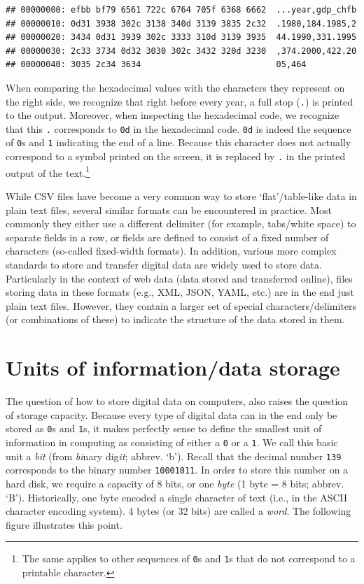 \documentclass[
  12pt,
]{style/krantz}
\begin{document}
\begin{verbatim}
## 00000000: efbb bf79 6561 722c 6764 705f 6368 6662  ...year,gdp_chfb
## 00000010: 0d31 3938 302c 3138 340d 3139 3835 2c32  .1980,184.1985,2
## 00000020: 3434 0d31 3939 302c 3333 310d 3139 3935  44.1990,331.1995
## 00000030: 2c33 3734 0d32 3030 302c 3432 320d 3230  ,374.2000,422.20
## 00000040: 3035 2c34 3634                           05,464
\end{verbatim}

When comparing the hexadecimal values with the characters they represent on the right side, we recognize that right before every year, a full stop (\texttt{.}) is printed to the output. Moreover, when inspecting the hexadecimal code, we recognize that this \texttt{.} corresponds to \texttt{0d} in the hexadecimal code. \texttt{0d} is indeed the sequence of \texttt{0}s and \texttt{1} indicating the end of a line. Because this character does not actually correspond to a symbol printed on the screen, it is replaced by \texttt{.} in the printed output of the text.\footnote{The same applies to other sequences of \texttt{0}s and \texttt{1}s that do not correspond to a printable character.}

While CSV files have become a very common way to store `flat'/table-like data in plain text files, several similar formats can be encountered in practice. Most commonly they either use a different delimiter (for example, tabs/white space) to separate fields in a row, or fields are defined to consist of a fixed number of characters (so-called fixed-width formats). In addition, various more complex standards to store and transfer digital data are widely used to store data. Particularly in the context of web data (data stored and transferred online), files storing data in these formats (e.g., XML, JSON, YAML, etc.) are in the end just plain text files. However, they contain a larger set of special characters/delimiters (or combinations of these) to indicate the structure of the data stored in them.

\hypertarget{units-of-informationdata-storage}{%
\section{Units of information/data storage}\label{units-of-informationdata-storage}}

The question of how to store digital data on computers, also raises the question of storage capacity. Because every type of digital data can in the end only be stored as \texttt{0}s and \texttt{1}s, it makes perfectly sense to define the smallest unit of information in computing as consisting of either a \texttt{0} or a \texttt{1}. We call this basic unit a \emph{bit} (from \emph{bi}nary dig\emph{it}; abbrev. `b'). Recall that the decimal number \texttt{139} corresponds to the binary number \texttt{10001011}. In order to store this number on a hard disk, we require a capacity of 8 bits, or one \emph{byte} (1 byte = 8 bits; abbrev. `B'). Historically, one byte encoded a single character of text (i.e., in the ASCII character encoding system). 4 bytes (or 32 bits) are called a \emph{word}. The following figure illustrates this point.
\end{document}

